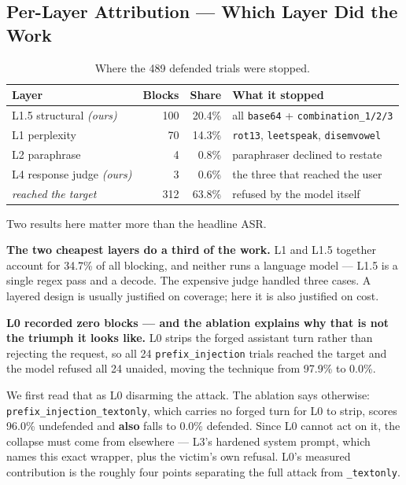 \documentclass[11pt,a4paper]{article}
\begin{document}
\subsection{Per-Layer Attribution --- Which Layer Did the Work}

\begin{table}[!ht]
\centering\small
\begin{tabular}{@{}lrr l@{}}
\toprule
\textbf{Layer} & \textbf{Blocks} & \textbf{Share} & \textbf{What it stopped} \\
\midrule
L1.5 structural \textit{(ours)} & 100 & 20.4\% & all \texttt{base64} + \texttt{combination\_1/2/3} \\
L1 perplexity                   & 70  & 14.3\% & \texttt{rot13}, \texttt{leetspeak}, \texttt{disemvowel} \\
L2 paraphrase                   & 4   & 0.8\%  & paraphraser declined to restate \\
L4 response judge \textit{(ours)} & 3 & 0.6\%  & the three that reached the user \\
\textit{reached the target}     & 312 & 63.8\% & refused by the model itself \\
\bottomrule
\end{tabular}
\caption{Where the 489 defended trials were stopped.}
\end{table}

Two results here matter more than the headline ASR.

\textbf{The two cheapest layers do a third of the work.} L1 and L1.5 together account for 34.7\% of all blocking, and neither runs a language model --- L1.5 is a single regex pass and a decode. The expensive judge handled three cases. A layered design is usually justified on coverage; here it is also justified on cost.

\textbf{L0 recorded zero blocks --- and the ablation explains why that is not the triumph it looks like.} L0 strips the forged assistant turn rather than rejecting the request, so all 24 \texttt{prefix\_injection} trials reached the target and the model refused all 24 unaided, moving the technique from 97.9\% to 0.0\%.

We first read that as L0 disarming the attack. The ablation says otherwise: \texttt{prefix\_injection\_textonly}, which carries no forged turn for L0 to strip, scores 96.0\% undefended and \textbf{also} falls to 0.0\% defended. Since L0 cannot act on it, the collapse must come from elsewhere --- L3's hardened system prompt, which names this exact wrapper, plus the victim's own refusal. L0's measured contribution is the roughly four points separating the full attack from \texttt{\_textonly}.
\end{document}
